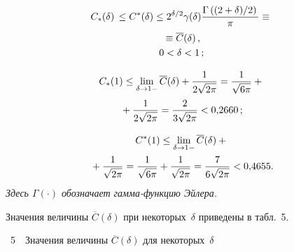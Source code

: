 \begin{multicols}{2}
\noindent
\begin{multline*}
C_*(\delta)\,\le C^*(\delta) \le
2^{\delta/2}\gamma(\delta)\fr{\Gamma\left((2+\delta)/2\right)}{\pi}\equiv{}\\
{}\equiv 
\overline{C}(\delta)\,,\\
 0<\delta < 1\,;
\end{multline*}

\vspace*{-12pt}

\noindent
\begin{multline*}
C_*(1) \le \lim_{\delta\to1-}\overline{C}(\delta)+\fr{1}{2\sqrt{2\pi}}=
\fr{1}{\sqrt{6\pi}}+{}\\
{}+
\fr{1}{2\sqrt{2\pi}}
=\fr{2}{3\sqrt{2\pi}}<0{,}2660\,;
\end{multline*}

\vspace*{-12pt}

\noindent
\begin{multline*}
C^*(1) \le \lim_{\delta\to 1-}\overline{C}(\delta)+{}\\
{}+
\fr{1}{\sqrt{2\pi}}=
\fr{1}{\sqrt{6\pi}}+\fr{1}{\sqrt{2\pi}} =
\fr{7}{6\sqrt{2\pi}}<0{,}4655.
\end{multline*}
\textit{Здесь $\Gamma(\cdot)$ обозначает гамма-функцию Эйлера.}

\smallskip

Значения величины $\overline{C}(\delta)$ при некоторых~$\delta$ приведены в
табл.~5.

\vspace*{12pt}
\noindent %
\begin{center}
\parbox{38mm}{{\tablename~5}\ \ \small{Значения величины
$\overline{C}(\delta)$ для некоторых~$\delta$}}
\end{center}
\vspace*{2pt}


\end{multicols}
